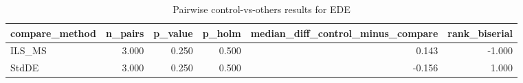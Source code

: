 \begin{table}[!t]
\centering
\caption{Pairwise control-vs-others results for EDE}
\label{tab:posthoc_holm_generated}
\begin{tabular}{lrrrrr}
\toprule
compare_method & n_pairs & p_value & p_holm & median_diff_control_minus_compare & rank_biserial \\
\midrule
ILS_MS & 3.000 & 0.250 & 0.500 & 0.143 & -1.000 \\
StdDE & 3.000 & 0.250 & 0.500 & -0.156 & 1.000 \\
\bottomrule
\end{tabular}

\end{table}